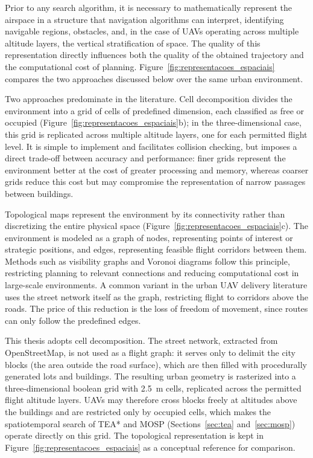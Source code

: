 Prior to any search algorithm, it is necessary to mathematically represent the airspace in a structure that navigation algorithms can interpret, identifying navigable regions, obstacles, and, in the case of UAVs operating across multiple altitude layers, the vertical stratification of space. The quality of this representation directly influences both the quality of the obtained trajectory and the computational cost of planning. Figure~\ref{fig:representacoes_espaciais} compares the two approaches discussed below over the same urban environment.

Two approaches predominate in the literature. Cell decomposition divides the environment into a grid of cells of predefined dimension, each classified as free or occupied (Figure~\ref{fig:representacoes_espaciais}b); in the three-dimensional case, this grid is replicated across multiple altitude layers, one for each permitted flight level. It is simple to implement and facilitates collision checking, but imposes a direct trade-off between accuracy and performance: finer grids represent the environment better at the cost of greater processing and memory, whereas coarser grids reduce this cost but may compromise the representation of narrow passages between buildings.

Topological maps represent the environment by its connectivity rather than discretizing the entire physical space (Figure~\ref{fig:representacoes_espaciais}c). The environment is modeled as a graph of nodes, representing points of interest or strategic positions, and edges, representing feasible flight corridors between them. Methods such as visibility graphs and Voronoi diagrams follow this principle, restricting planning to relevant connections and reducing computational cost in large-scale environments. A common variant in the urban UAV delivery literature uses the street network itself as the graph, restricting flight to corridors above the roads. The price of this reduction is the loss of freedom of movement, since routes can only follow the predefined edges.

This thesis adopts cell decomposition. The street network, extracted from OpenStreetMap, is not used as a flight graph: it serves only to delimit the city blocks (the area outside the road surface), which are then filled with procedurally generated lots and buildings. The resulting urban geometry is rasterized into a three-dimensional boolean grid with 2.5~m cells, replicated across the permitted flight altitude layers. UAVs may therefore cross blocks freely at altitudes above the buildings and are restricted only by occupied cells, which makes the spatiotemporal search of TEA* and MOSP (Sections~\ref{sec:tea} and~\ref{sec:mosp}) operate directly on this grid. The topological representation is kept in Figure~\ref{fig:representacoes_espaciais} as a conceptual reference for comparison.

